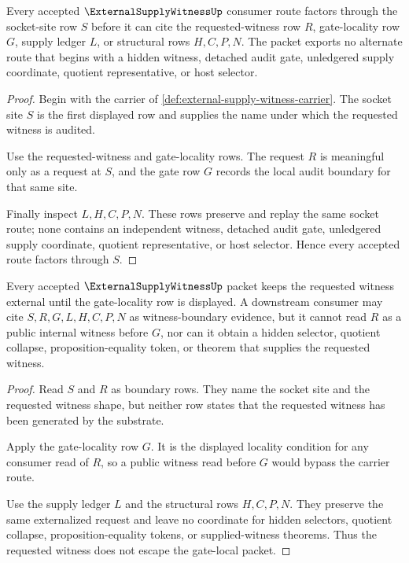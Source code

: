 \begin{theorem}
\label{thm:external-supply-witness-socket-factorization}
Every accepted $\ExternalSupplyWitnessUp$ consumer route factors through the socket-site row $S$ before it can cite the requested-witness row $R$, gate-locality row $G$, supply ledger $L$, or structural rows $H,C,P,N$. The packet exports no alternate route that begins with a hidden witness, detached audit gate, unledgered supply coordinate, quotient representative, or host selector.
\end{theorem}
\begin{proof}
Begin with the carrier of \autoref{def:external-supply-witness-carrier}. The socket site $S$ is the first displayed row and supplies the name under which the requested witness is audited.

Use the requested-witness and gate-locality rows. The request $R$ is meaningful only as a request at $S$, and the gate row $G$ records the local audit boundary for that same site.

Finally inspect $L,H,C,P,N$. These rows preserve and replay the same socket route; none contains an independent witness, detached audit gate, unledgered supply coordinate, quotient representative, or host selector. Hence every accepted route factors through $S$.
\end{proof}

\begin{theorem}
\label{thm:external-supply-witness-nonescape}
Every accepted $\ExternalSupplyWitnessUp$ packet keeps the requested witness external until the gate-locality row is displayed. A downstream consumer may cite $S,R,G,L,H,C,P,N$ as witness-boundary evidence, but it cannot read $R$ as a public internal witness before $G$, nor can it obtain a hidden selector, quotient collapse, proposition-equality token, or theorem that supplies the requested witness.
\end{theorem}
\begin{proof}
Read $S$ and $R$ as boundary rows. They name the socket site and the requested witness shape, but neither row states that the requested witness has been generated by the substrate.

Apply the gate-locality row $G$. It is the displayed locality condition for any consumer read of $R$, so a public witness read before $G$ would bypass the carrier route.

Use the supply ledger $L$ and the structural rows $H,C,P,N$. They preserve the same externalized request and leave no coordinate for hidden selectors, quotient collapse, proposition-equality tokens, or supplied-witness theorems. Thus the requested witness does not escape the gate-local packet.
\end{proof}

